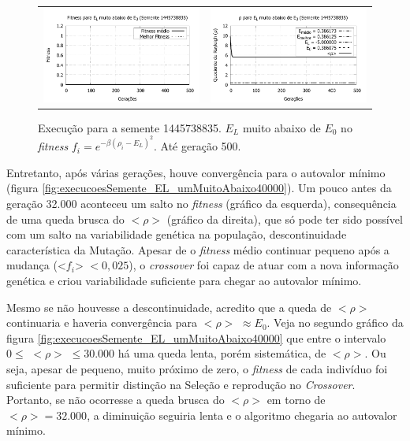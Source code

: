 	\begin{figure}[htbp]
	\centering
  \begin{tabular}{@{}cc@{}}	
		\includegraphics[width=.45\textwidth]{figs/resultados/variandoELSemente/T4_S-1445738835_fitness.pdf} &
    \includegraphics[width=.45\textwidth]{figs/resultados/variandoELSemente/T4_S-1445738835_rho.pdf}
  \end{tabular}
  \caption{Execução para a semente 1445738835. $E_L$ muito abaixo de $E_0$ no \textit{fitness} $f_i = e^{-\beta(\rho_i - E_L)^2}$. Até geração 500.}
	\label{fig:execucoesSemente_EL_umMuitoAbaixo500}
	\end{figure}
		
	Entretanto, após várias gerações, houve convergência para o autovalor mínimo (figura \ref{fig:execucoesSemente_EL_umMuitoAbaixo40000}). Um pouco antes da geração 32.000 aconteceu um salto no \emph{fitness} (gráfico da esquerda), consequência de uma queda brusca do $<\rho>$ (gráfico da direita), que só pode ter sido possível com um salto na variabilidade genética na população, descontinuidade característica da Mutação. Apesar de o \emph{fitness} médio continuar pequeno após a mudança (<$f_i$> $< 0,025$), o \emph{crossover} foi capaz de atuar com a nova informação genética e criou variabilidade suficiente para chegar ao autovalor mínimo.
	
	Mesmo se não houvesse a descontinuidade, acredito que a queda de $<\rho>$ continuaria e haveria convergência para $<\rho>$ $\approx E_0$. Veja no segundo gráfico da figura \ref{fig:execucoesSemente_EL_umMuitoAbaixo40000} que entre o intervalo $0 \leq$ $<\rho>$ $\leq 30.000$ há uma queda lenta, porém sistemática, de $<\rho>$. Ou seja, apesar de pequeno, muito próximo de zero, o \emph{fitness} de cada indivíduo foi suficiente para permitir distinção na Seleção e reprodução no \emph{Crossover}. Portanto, se não ocorresse a queda brusca do $<\rho>$ em torno de $<\rho> = 32.000$, a diminuição seguiria lenta e o algoritmo chegaria ao autovalor mínimo.
	
